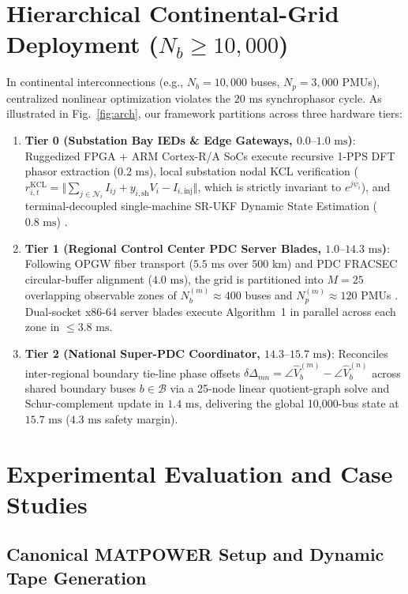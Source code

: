\documentclass[journal,twoside]{IEEEtran}
\begin{document}
\section{Hierarchical Continental-Grid Deployment ($N_b \ge 10,000$)}
In continental interconnections (e.g., $N_b = 10,000$ buses, $N_p = 3,000$ PMUs), centralized nonlinear optimization violates the $20\text{~ms}$ synchrophasor cycle. As illustrated in Fig.~\ref{fig:arch}, our framework partitions across three hardware tiers:
\begin{enumerate}
    \item \textbf{Tier 0 (Substation Bay IEDs \& Edge Gateways, $0.0\text{--}1.0\text{~ms}$)}: Ruggedized FPGA + ARM Cortex-R/A SoCs execute recursive 1-PPS DFT phasor extraction ($0.2\text{~ms}$), local substation nodal KCL verification ($r_{i,t}^{\mathrm{KCL}} = \Vert{}\sum_{j \in \mathcal{N}_i} I_{ij} + y_{i,\mathrm{sh}}V_i - I_{i,\mathrm{inj}}\Vert{}$, which is strictly invariant to $e^{j\psi_i}$), and terminal-decoupled single-machine SR-UKF Dynamic State Estimation ($0.8\text{~ms}$) \cite{zhao2018robust,meliopoulos2017dynamic}.
    \item \textbf{Tier 1 (Regional Control Center PDC Server Blades, $1.0\text{--}14.3\text{~ms}$)}: Following OPGW fiber transport ($5.5\text{~ms}$ over $500\text{~km}$) and PDC FRACSEC circular-buffer alignment ($4.0\text{~ms}$), the grid is partitioned into $M = 25$ overlapping observable zones of $N_b^{(m)} \approx 400$ buses and $N_p^{(m)} \approx 120$ PMUs \cite{chakhchoukh2021power}. Dual-socket x86-64 server blades execute Algorithm~1 in parallel across each zone in $\le 3.8\text{~ms}$.
    \item \textbf{Tier 2 (National Super-PDC Coordinator, $14.3\text{--}15.7\text{~ms}$)}: Reconciles inter-regional boundary tie-line phase offsets $\delta\Delta_{mn} = \angle\hat{V}_b^{(m)} - \angle\hat{V}_b^{(n)}$ across shared boundary buses $b \in \mathcal{B}$ via a 25-node linear quotient-graph solve and Schur-complement update in $1.4\text{~ms}$, delivering the global 10,000-bus state at $15.7\text{~ms}$ ($4.3\text{~ms}$ safety margin).
\end{enumerate}

\section{Experimental Evaluation and Case Studies}

\subsection{Canonical MATPOWER Setup and Dynamic Tape Generation}
\end{document}
